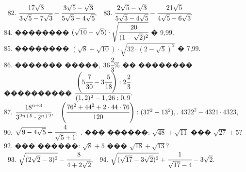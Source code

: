 \documentclass[12pt]{article}
\begin{document}
$\begin{array}{ll}
82.\ \cfrac{17\sqrt{3}}{3\sqrt{5}-7\sqrt{3}}-\cfrac{3\sqrt{5}-\sqrt{3}}{5\sqrt{3}-4\sqrt{5}},&
83.\ \cfrac{2\sqrt{5}-\sqrt{3}}{5\sqrt{3}-4\sqrt{5}}-\cfrac{21\sqrt{5}}{4\sqrt{5}-6\sqrt{3}},
\end{array}$\\
84. �������� $(\sqrt{10}-\sqrt{5})\cdot\sqrt{\cfrac{20}{(1-\sqrt{2})^2}}$ � 9,99.\\
85. �������� $(\sqrt{8}+\sqrt{10})\cdot\sqrt{32\cdot(2-\sqrt{5})^2}$ � 7,99.\\
86. ������� �����, $36\cfrac{2}{3}\%$ �� �������� ����������
$\cfrac{\left(5\cfrac{7}{30}-3\cfrac{5}{18}\right):2\cfrac{2}{3}}{(1,2)^2-1,26:0,9}.$\\
87. $\cfrac{18^{n+3}}{3^{2n+5}\cdot2^{n+2}},$ . $\left(\cfrac{76^2+44^2+2\cdot44\cdot76}{120}\right):(37^2-13^2),$. $4322^2-4321\cdot4323,$ \\ 90. $\sqrt{9-4\sqrt{5}}-\cfrac{4}{\sqrt{5}+1},$ \qquad {}. ��� ������: $\sqrt{48}+\sqrt{11}$ ��� $\sqrt{27}+5?$ \\
92. ��� ������: $\sqrt{8}+5$ ��� $\sqrt{18}+\sqrt{13}?$\\
$\begin{array}{ll}
93.\ \sqrt{(2\sqrt{2}-3)^2}-\cfrac{8}{4+2\sqrt{2}},&
94.\ \sqrt{(\sqrt{17}-3\sqrt{2})^2}+\cfrac{1}{\sqrt{17}-4}-3\sqrt{2}.
\end{array}$
\newpage
\end{document}
